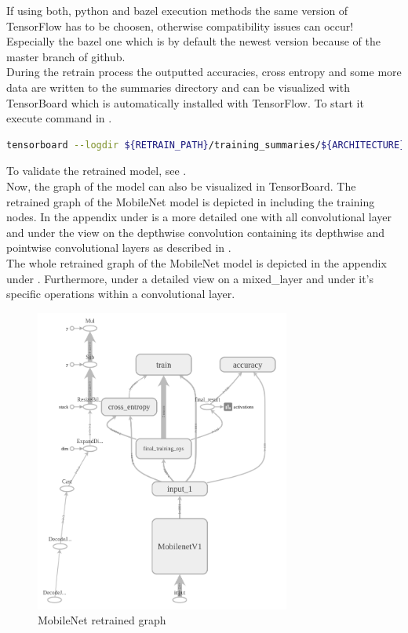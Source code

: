 If using both, python and bazel execution methods the same version of TensorFlow has to be choosen, otherwise compatibility issues can occur! Especially the bazel one which is by default the newest version because of the master branch of github. \\


During the retrain process the outputted accuracies, cross entropy and some more data are written to the summaries directory and can be visualized with TensorBoard which is automatically installed with TensorFlow. To start it execute command in .

\begin{lstlisting}[caption=Build and call of \textit{retrain}, label=list:tensorboard, language=bash]
	tensorboard --logdir ${RETRAIN_PATH}/training_summaries/${ARCHITECTURE}_${TRAINING_STEPS}/ &
\end{lstlisting}

To validate the retrained model, see . \\

Now, the graph of the model can also be visualized in TensorBoard.
The retrained graph of the MobileNet model is depicted in  including the training nodes. In the appendix under \subsecref{} is a more detailed one with all convolutional layer and under \subsecref{} the view on the depthwise convolution containing its depthwise and pointwise convolutional layers as described in . \\
The whole retrained graph of the MobileNet model is depicted in the appendix under \subsecref{}. Furthermore, under \subsecref{} a detailed view on a mixed_layer and under \subsecref{} it's specific operations within a convolutional layer. \\

\begin{figure}[htbp]
\centering
\includegraphics[height=10cm]{includes/graphMobilenet050-700}
\caption[MobileNet retrained graph]{MobileNet retrained graph}
\label{fig:graphMobilenet050-700}
\end{figure}



